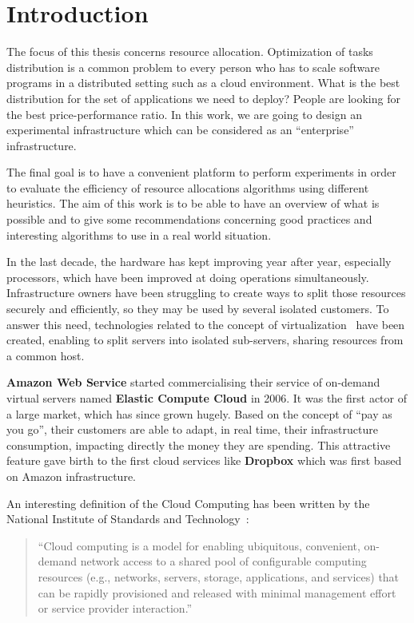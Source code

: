 \chapter*{Introduction}

The focus of this thesis concerns resource allocation. Optimization of
tasks distribution is a common problem to every person who has to scale
software programs in a distributed setting such as a cloud environment. What is the
best distribution for the set of applications we need to deploy? People are
looking for the best price-performance ratio. In this work, we are going to
design an experimental infrastructure which can be considered as an
``enterprise'' infrastructure.

The final goal is to have a convenient platform to perform experiments in order
to evaluate the efficiency of resource allocations algorithms using different
heuristics. The aim of this work is to be able to have an overview of what is
possible and to give some recommendations concerning good practices and
interesting algorithms to use in a real world situation.

In the last decade, the hardware has kept improving year
after year, especially processors, which have been improved at doing operations
simultaneously. Infrastructure owners have been struggling to create ways to
split those resources securely and efficiently, so they may be used by several
isolated customers. To answer this need, technologies related to the concept of
virtualization~\cite{virtualisation} have been created, enabling to split
servers into isolated sub-servers, sharing resources from a common host.

\textbf{Amazon Web Service} started commercialising their service of
on-demand virtual servers named \textbf{Elastic Compute Cloud} in 2006. It was
the first actor of a large market, which has since grown hugely. Based on the
concept of ``pay as you go'', their customers are able to adapt, in real
time, their infrastructure consumption, impacting directly the money they are
spending. This attractive feature gave birth to the first cloud services like
\textbf{Dropbox} which was first based on Amazon infrastructure.

An interesting definition of the Cloud Computing has been written by the
National Institute of Standards and Technology~\citep*{nistcloudcomputing}:
\begin{quote}
	“Cloud computing is a model for enabling ubiquitous, convenient, on-demand
	network access to a shared pool of configurable computing resources (e.g.,
	networks, servers, storage, applications, and services) that can be rapidly
	provisioned and released with minimal management effort or service provider
	interaction.”
\end{quote}

